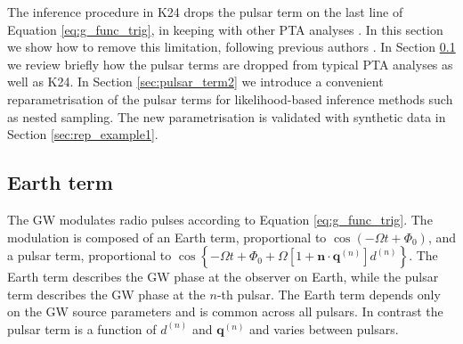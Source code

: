 \documentclass[fleqn,usenatbib,useAMS]{mnras}
\begin{document}
 
The inference procedure in K24 drops the pulsar term on the last line of Equation \eqref{eq:g_func_trig}, in keeping with other PTA analyses \citep[e.g.][]{Sesana2010,Babak2012,Petiteau2013,Zhu2015,Taylors2016,Goldstein2018,Charisi2023arXiv230403786C}. In this section we show how to remove this limitation, following previous authors \citep{Zhupulsarterms,Chen2022}. In Section \ref{sec:earth_term} we review briefly how the pulsar terms are dropped from typical PTA analyses as well as K24. In Section \ref{sec:pulsar_term2} we introduce a convenient reparametrisation of the pulsar terms for likelihood-based inference methods such as nested sampling. The new parametrisation is validated with synthetic data in Section \ref{sec:rep_example1}.



\subsection{Earth term}\label{sec:earth_term}
The GW modulates radio pulses according to Equation \eqref{eq:g_func_trig}. The modulation is composed of an Earth term, proportional to $\cos(-\Omega t + \Phi_0)$, and a pulsar term, proportional to $\cos \left \{-\Omega t +\Phi_0 + \Omega \left[1 + \boldsymbol{n}\cdot \boldsymbol{q}^{(n)} \right]  d^{(n)} \right \}$. The Earth term describes the GW phase at the observer on Earth, while the pulsar term describes the GW phase at the $n$-th pulsar. The Earth term depends only on the GW source parameters and is common across all pulsars. In contrast the pulsar term is a function of $d^{(n)}$ and $\boldsymbol{q}^{(n)}$ and varies between pulsars. \newline 
\end{document}
